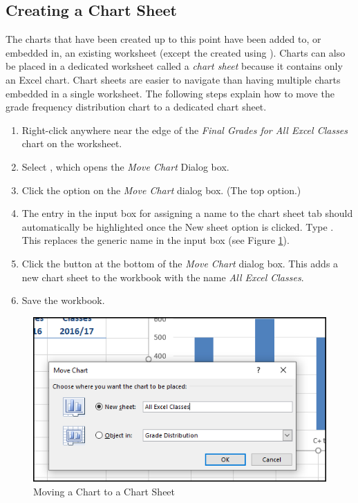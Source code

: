 \subsection{Creating a Chart Sheet}

The charts that have been created up to this point have been added to, or embedded in, an existing worksheet (except the  created using ). Charts can also be placed in a dedicated worksheet called a \textit{chart sheet} because it contains only an Excel chart. Chart sheets are easier to navigate than having multiple charts embedded in a single worksheet. The following steps explain how to move the grade frequency distribution chart to a dedicated chart sheet.

\begin{enumerate}
	\item Right-click anywhere near the edge of the \textit{Final Grades for All Excel Classes} chart on the  worksheet.
	\item Select , which opens the \textit{Move Chart} Dialog box.
	\item Click the  option on the \textit{Move Chart} dialog box. (The top option.)
	\item The entry in the input box for assigning a name to the chart sheet tab should automatically be highlighted once the New sheet option is clicked. Type . This replaces the generic name in the input box (see Figure \ref{04:fig15}).
	\item Click the  button at the bottom of the \textit{Move Chart} dialog box. This adds a new chart sheet to the workbook with the name \textit{All Excel Classes}.
	\item Save the  workbook.
\end{enumerate}

\begin{figure}[H]
	\centering
	\includegraphics[width=\maxwidth{.95\linewidth}]{gfx/ch04_fig15}
	\caption{Moving a Chart to a Chart Sheet}
	\label{04:fig15}
\end{figure}

